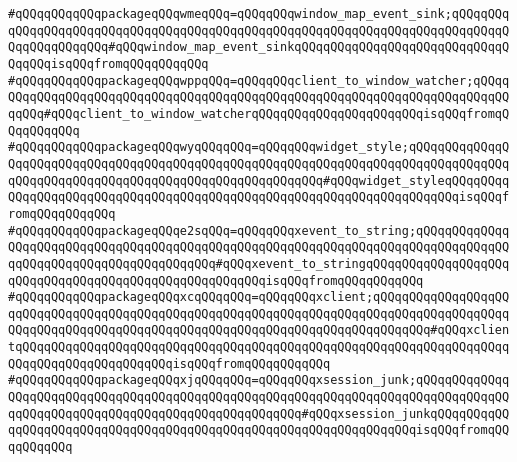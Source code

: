 \verb|#qQQqqQQqqQQqpackageqQQqwmeqQQq=qQQqqQQqwindow_map_event_sink;qQQqqQQqqQQqqQQqqQQqqQQqqQQqqQQqqQQqqQQqqQQqqQQqqQQqqQQqqQQqqQQqqQQqqQQqqQQqqQQqqQQqqQQqqQQq#qQQqwindow_map_event_sinkqQQqqQQqqQQqqQQqqQQqqQQqqQQqqQQqqQQqisqQQqfromqQQqqQQqqQQq|\newline
\verb|#qQQqqQQqqQQqpackageqQQqwppqQQq=qQQqqQQqclient_to_window_watcher;qQQqqQQqqQQqqQQqqQQqqQQqqQQqqQQqqQQqqQQqqQQqqQQqqQQqqQQqqQQqqQQqqQQqqQQqqQQqqQQq#qQQqclient_to_window_watcherqQQqqQQqqQQqqQQqqQQqqQQqisqQQqfromqQQqqQQqqQQq|\newline
\verb|#qQQqqQQqqQQqpackageqQQqwyqQQqqQQq=qQQqqQQqwidget_style;qQQqqQQqqQQqqQQqqQQqqQQqqQQqqQQqqQQqqQQqqQQqqQQqqQQqqQQqqQQqqQQqqQQqqQQqqQQqqQQqqQQqqQQqqQQqqQQqqQQqqQQqqQQqqQQqqQQqqQQqqQQqqQQq#qQQqwidget_styleqQQqqQQqqQQqqQQqqQQqqQQqqQQqqQQqqQQqqQQqqQQqqQQqqQQqqQQqqQQqqQQqqQQqqQQqisqQQqfromqQQqqQQqqQQq|\newline
\verb|#qQQqqQQqqQQqpackageqQQqe2sqQQq=qQQqqQQqxevent_to_string;qQQqqQQqqQQqqQQqqQQqqQQqqQQqqQQqqQQqqQQqqQQqqQQqqQQqqQQqqQQqqQQqqQQqqQQqqQQqqQQqqQQqqQQqqQQqqQQqqQQqqQQqqQQqqQQq#qQQqxevent_to_stringqQQqqQQqqQQqqQQqqQQqqQQqqQQqqQQqqQQqqQQqqQQqqQQqqQQqqQQqisqQQqfromqQQqqQQqqQQq|\newline
\verb|#qQQqqQQqqQQqpackageqQQqxcqQQqqQQq=qQQqqQQqxclient;qQQqqQQqqQQqqQQqqQQqqQQqqQQqqQQqqQQqqQQqqQQqqQQqqQQqqQQqqQQqqQQqqQQqqQQqqQQqqQQqqQQqqQQqqQQqqQQqqQQqqQQqqQQqqQQqqQQqqQQqqQQqqQQqqQQqqQQqqQQqqQQqqQQq#qQQqxclientqQQqqQQqqQQqqQQqqQQqqQQqqQQqqQQqqQQqqQQqqQQqqQQqqQQqqQQqqQQqqQQqqQQqqQQqqQQqqQQqqQQqqQQqqQQqisqQQqfromqQQqqQQqqQQq|\newline
\verb|#qQQqqQQqqQQqpackageqQQqxjqQQqqQQq=qQQqqQQqxsession_junk;qQQqqQQqqQQqqQQqqQQqqQQqqQQqqQQqqQQqqQQqqQQqqQQqqQQqqQQqqQQqqQQqqQQqqQQqqQQqqQQqqQQqqQQqqQQqqQQqqQQqqQQqqQQqqQQqqQQqqQQqqQQq#qQQqxsession_junkqQQqqQQqqQQqqQQqqQQqqQQqqQQqqQQqqQQqqQQqqQQqqQQqqQQqqQQqqQQqqQQqqQQqisqQQqfromqQQqqQQqqQQq|\newline
